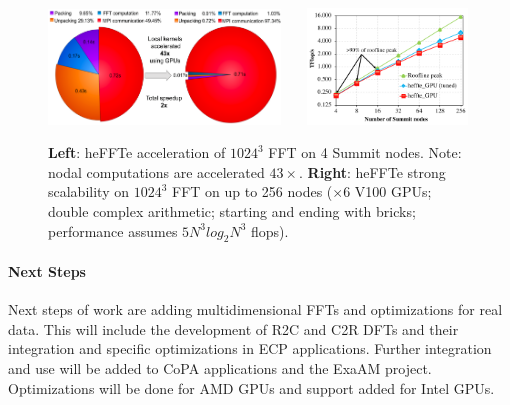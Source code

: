 \begin{figure}[htb]
   \centering
   \includegraphics[width=0.55\textwidth]{projects/2.3.3-MathLibs/2.3.3.13-CLOVER/heFFTeAcceleration}~~~
   \includegraphics[width=0.38\textwidth]{projects/2.3.3-MathLibs/2.3.3.13-CLOVER/heFFTeStrongScalability}
    \caption{\label{fig:fft-ecp-progress}
    {\bf Left}: heFFTe acceleration of $1024^3$ FFT on 4 Summit nodes.
                Note: nodal computations are accelerated $43\times$. 
    {\bf Right}: heFFTe strong scalability on $1024^3$ 
                FFT on up to 256 nodes ($\times 6$ V100 GPUs;
                double complex arithmetic; starting and ending with bricks; 
                performance assumes $5 N^3 log_2 N^3$ flops).}
\end{figure}


\paragraph{Next Steps}
Next steps of work are adding multidimensional FFTs and optimizations for 
real data. This will include the development of R2C and C2R DFTs and their 
integration and specific optimizations in ECP applications.
Further integration and use will be added to CoPA applications and the ExaAM project.
Optimizations will be done for AMD GPUs and support added for Intel GPUs.

